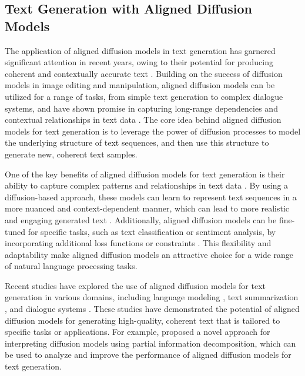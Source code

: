 \documentclass[11pt,a4paper]{article}
\begin{document}
\subsection{Text Generation with Aligned Diffusion Models}


The application of aligned diffusion models in text generation has garnered significant attention in recent years, owing to their potential for producing coherent and contextually accurate text \cite{arxiv:2303.07576}. Building on the success of diffusion models in image editing and manipulation, aligned diffusion models can be utilized for a range of tasks, from simple text generation to complex dialogue systems, and have shown promise in capturing long-range dependencies and contextual relationships in text data \cite{doi:10.1145/3626235}. The core idea behind aligned diffusion models for text generation is to leverage the power of diffusion processes to model the underlying structure of text sequences, and then use this structure to generate new, coherent text samples.

One of the key benefits of aligned diffusion models for text generation is their ability to capture complex patterns and relationships in text data \cite{doi:10.1109/tkde.2024.3361474}. By using a diffusion-based approach, these models can learn to represent text sequences in a more nuanced and context-dependent manner, which can lead to more realistic and engaging generated text \cite{arxiv:2302.10907}. Additionally, aligned diffusion models can be fine-tuned for specific tasks, such as text classification or sentiment analysis, by incorporating additional loss functions or constraints \cite{arxiv:2305.13301}. This flexibility and adaptability make aligned diffusion models an attractive choice for a wide range of natural language processing tasks.

Recent studies have explored the use of aligned diffusion models for text generation in various domains, including language modeling \cite{doi:10.3389/frobt.2025.1606247}, text summarization \cite{arxiv:2407.01392}, and dialogue systems \cite{arxiv:2406.01572}. These studies have demonstrated the potential of aligned diffusion models for generating high-quality, coherent text that is tailored to specific tasks or applications. For example, \cite{arxiv:2406.05191} proposed a novel approach for interpreting diffusion models using partial information decomposition, which can be used to analyze and improve the performance of aligned diffusion models for text generation.
\end{document}

